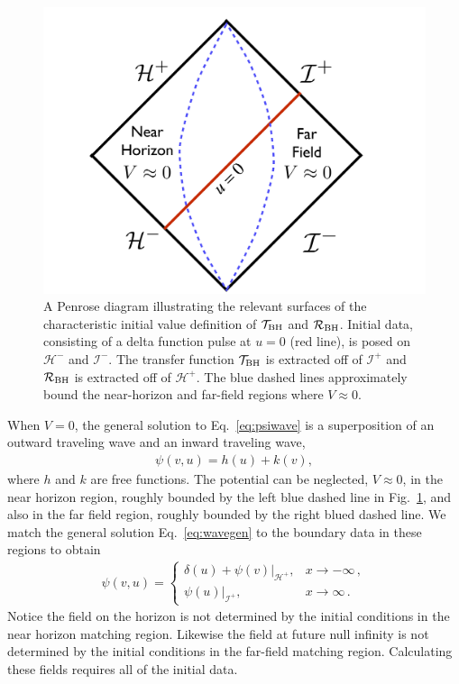 \begin{refsection}
\begin{figure}[t]
\includegraphics[width = 1 \columnwidth]{chapter_echo/etc/RTDomains}
\caption{
A Penrose diagram illustrating the relevant surfaces of the characteristic initial value definition of $\mathcal T_{\rm BH}$ and $\mathcal R_{\rm BH}$. 
Initial data, consisting of a delta function pulse at $u=0$ (red line), is posed on $\mathcal{H} ^-$ and $\mathcal{I}^-$. The transfer function $\mathcal T_{\rm BH}$ is extracted off of $\mathcal{I}^+$ and $\mathcal R_{\rm BH}$ is extracted off of $\mathcal{H} ^+$. The blue dashed lines approximately bound the near-horizon and far-field regions where $V\approx 0$. 
}
\label{fig:RTDom}
\end{figure}

When $V=0$, the general solution to Eq.~\eqref{eq:psiwave} is a superposition of an outward traveling wave and an inward traveling wave, 
\begin{align}
\psi(v,u)=h(u)+k(v) \label{eq:wavegen},
\end{align}
where $h$ and $k$ are free functions.
The potential can be neglected, $V\approx 0$, in the near horizon region, roughly bounded by the left blue dashed line in Fig.~\ref{fig:RTDom}, and also in the far field region, roughly bounded by the right blued dashed line. We match the general solution Eq.~\eqref{eq:wavegen} to the boundary data in these regions to obtain 
\begin{align}
\psi(v,u)=\begin{cases}
\delta(u)+\left. \psi(v)\right |_{\mathcal{H}^+}, & x \to -\infty \,, \\
\left. \psi(u)\right |_{\mathcal{I}^+}, & x \to \infty \,.
\end{cases}
\end{align}
Notice the field on the horizon is not determined by the initial conditions in the near horizon matching region. 
Likewise the field at future null infinity is not determined by the initial conditions in the far-field matching region. 
Calculating these fields requires all of the initial data.


\end{refsection}
